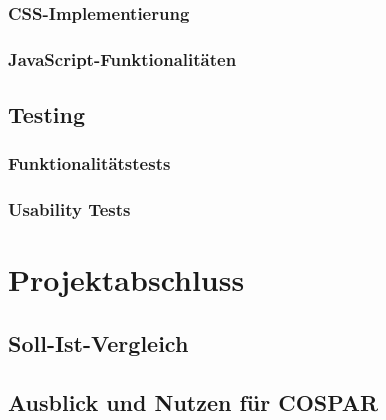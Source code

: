\documentclass[11pt,a4paper]{article}
\begin{document}
\subsubsection{CSS-Implementierung}

\subsubsection{JavaScript-Funktionalitäten}

\subsection{Testing}

\subsubsection{Funktionalitätstests}

\subsubsection{Usability Tests}

\newpage
\section{Projektabschluss}

\subsection{Soll-Ist-Vergleich}

\subsection{Ausblick und Nutzen für COSPAR}
\end{document}

